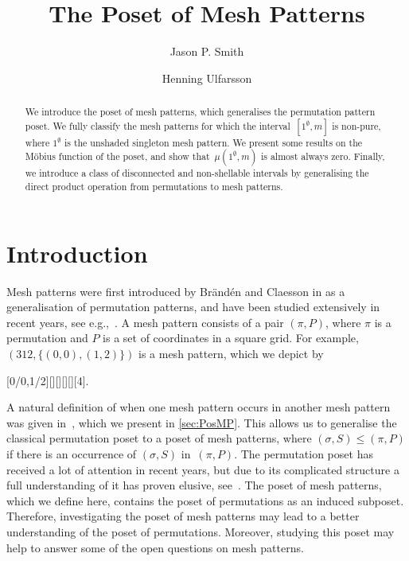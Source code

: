 \documentclass[preprint,11pt]{elsarticle}
\numberwithin{equation}{section}
\numberwithin{figure}{section}
\numberwithin{thm}{section}
\begin{document}
\begin{frontmatter}
\title{The Poset of Mesh Patterns}
\author[add1]{Jason P. Smith}
\author[add2]{Henning Ulfarsson}
\address[add1]{Department of Mathematics, University of Aberdeen, Aberdeen, UK}
\address[add2]{Department of Computer Science, Reykjavik University, Reykjavik, Iceland}
\begin{abstract}
	We introduce the poset of mesh patterns, which generalises the permutation pattern poset.
	We fully classify the mesh patterns for which the interval~$[1^\emptyset,m]$ is non-pure,
	where $1^\emptyset$ is the unshaded singleton mesh
	pattern. We present some results on the M\"obius function of the poset, and show
	that~$\mu(1^\emptyset,m)$ is almost always zero. Finally, we introduce a class
	of disconnected and non-shellable intervals by generalising the direct product operation
	from permutations to mesh patterns.
	\end{abstract}
\end{frontmatter}

\section{Introduction}
Mesh patterns were first introduced by Br\"and\'en and Claesson in \cite{Bra11} as a generalisation
of permutation patterns, and have been studied extensively in recent years, see e.g.,~\cite{CTU15,JKR15}.
A mesh pattern consists of a pair $(\pi,P)$, where $\pi$ is a permutation and $P$ is a set of coordinates
in a square grid. For example, $(312,\{(0,0),(1,2)\})$ is a mesh
pattern, which we depict by
\begin{center}
[0/0,1/2][][][][][4].
\end{center}

A natural definition of when one mesh pattern occurs in another mesh pattern was given in~\cite{TU17},
which we present in \cref{sec:PosMP}.
This allows us to generalise the classical permutation poset to a poset of mesh patterns, where
$(\sigma,S)\le(\pi,P)$ if there is an occurrence of $(\sigma,S)$ in~$(\pi,P)$. The permutation poset
has received a lot of attention in recent years, but due to its
complicated structure a full understanding of it has proven elusive,
see~\cite{McSt13,Smith15}. The poset of mesh patterns, which we define
here, contains the poset of permutations as an induced subposet. Therefore, investigating
the poset of mesh patterns may lead to a better understanding of the poset of permutations. Moreover, 
studying this poset may help to answer some of the open questions on mesh patterns.
\end{document}
